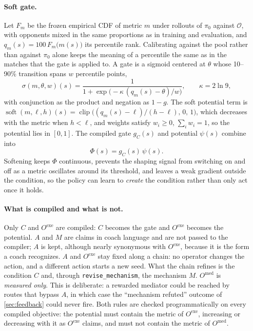 \documentclass[11pt]{article}
\newcommand{\opp}{\mathcal{O}}           %
\newcommand{\code}[1]{\texttt{\small #1}}
\begin{document}
\paragraph{Soft gate.}
Let $F_m$ be the frozen empirical CDF of metric $m$ under rollouts of $\pi_0$ against $\opp$, with opponents mixed in the same proportions as in training and evaluation, and $q_m(s) = 100\,F_m\bigl(m(s)\bigr)$ its percentile rank.
Calibrating against the pool rather than against $\pi_0$ alone keeps the meaning of a percentile the same as in the matches that the gate is applied to.
A gate is a sigmoid centered at $\theta$ whose 10--90\% transition spans $w$ percentile points,
\begin{equation}
  \sigma(m, \theta, w)(s) = \frac{1}{1+\exp\!\bigl(-\kappa\,(q_m(s)-\theta)/w\bigr)}, \qquad \kappa = 2\ln 9,
\end{equation}
with conjunction as the product and negation as $1-g$.
The soft potential term is $\operatorname{soft}(m,\ell,h)(s)=\operatorname{clip}\bigl((q_m(s)-\ell)/(h-\ell),\,0,\,1\bigr)$, which decreases with the metric when $h<\ell$, and weights satisfy $w_i\ge 0$, $\sum_i w_i=1$, so the potential lies in $[0,1]$.
The compiled gate $g_C(s)$ and potential $\psi(s)$ combine into
\begin{equation}
  \Phi(s) = g_C(s)\,\psi(s).
\end{equation}
Softening keeps $\Phi$ continuous, prevents the shaping signal from switching on and off as a metric oscillates around its threshold, and leaves a weak gradient outside the condition, so the policy can learn to \emph{create} the condition rather than only act once it holds.

\paragraph{What is compiled and what is not.}
Only $C$ and $O^{\mathrm{exe}}$ are compiled: $C$ becomes the gate and $O^{\mathrm{exe}}$ becomes the potential.
$A$ and $M$ are claims in coach language and are not passed to the compiler; $A$ is kept, although nearly synonymous with $O^{\mathrm{exe}}$, because it is the form a coach recognizes.
$A$ and $O^{\mathrm{exe}}$ stay fixed along a chain: no operator changes the action, and a different action starts a new seed.
What the chain refines is the condition $C$ and, through \code{revise\_mechanism}, the mechanism $M$.
$O^{\mathrm{med}}$ is \emph{measured only}.
This is deliberate: a rewarded mediator could be reached by routes that bypass $A$, in which case the ``mechanism refuted'' outcome of \cref{sec:feedback} could never fire.
Both rules are checked programmatically on every compiled objective: the potential must contain the metric of $O^{\mathrm{exe}}$, increasing or decreasing with it as $O^{\mathrm{exe}}$ claims, and must not contain the metric of $O^{\mathrm{med}}$.
\end{document}
